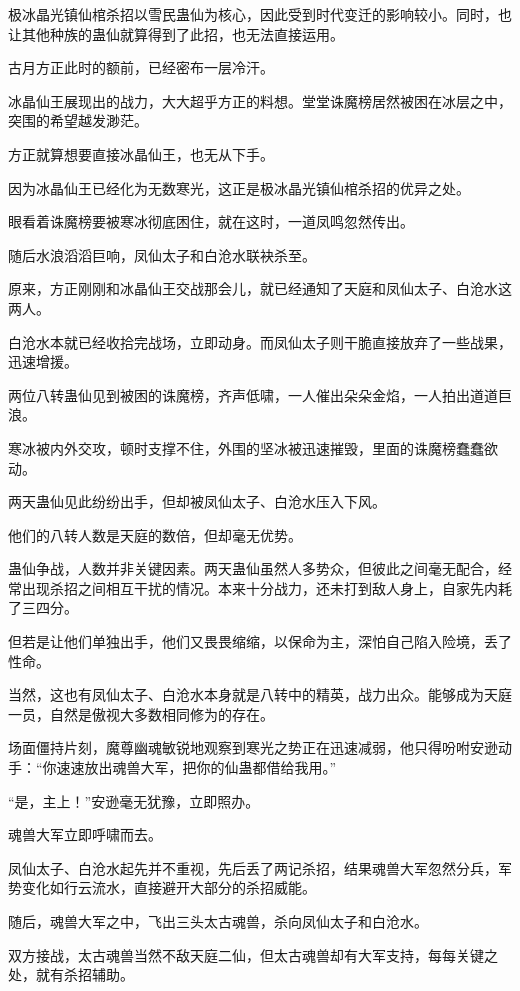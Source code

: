 \begin{this_body}
极冰晶光镇仙棺杀招以雪民蛊仙为核心，因此受到时代变迁的影响较小。同时，也让其他种族的蛊仙就算得到了此招，也无法直接运用。

古月方正此时的额前，已经密布一层冷汗。

冰晶仙王展现出的战力，大大超乎方正的料想。堂堂诛魔榜居然被困在冰层之中，突围的希望越发渺茫。

方正就算想要直接冰晶仙王，也无从下手。

因为冰晶仙王已经化为无数寒光，这正是极冰晶光镇仙棺杀招的优异之处。

眼看着诛魔榜要被寒冰彻底困住，就在这时，一道凤鸣忽然传出。

随后水浪滔滔巨响，凤仙太子和白沧水联袂杀至。

原来，方正刚刚和冰晶仙王交战那会儿，就已经通知了天庭和凤仙太子、白沧水这两人。

白沧水本就已经收拾完战场，立即动身。而凤仙太子则干脆直接放弃了一些战果，迅速增援。

两位八转蛊仙见到被困的诛魔榜，齐声低啸，一人催出朵朵金焰，一人拍出道道巨浪。

寒冰被内外交攻，顿时支撑不住，外围的坚冰被迅速摧毁，里面的诛魔榜蠢蠢欲动。

两天蛊仙见此纷纷出手，但却被凤仙太子、白沧水压入下风。

他们的八转人数是天庭的数倍，但却毫无优势。

蛊仙争战，人数并非关键因素。两天蛊仙虽然人多势众，但彼此之间毫无配合，经常出现杀招之间相互干扰的情况。本来十分战力，还未打到敌人身上，自家先内耗了三四分。

但若是让他们单独出手，他们又畏畏缩缩，以保命为主，深怕自己陷入险境，丢了性命。

当然，这也有凤仙太子、白沧水本身就是八转中的精英，战力出众。能够成为天庭一员，自然是傲视大多数相同修为的存在。

场面僵持片刻，魔尊幽魂敏锐地观察到寒光之势正在迅速减弱，他只得吩咐安逊动手：“你速速放出魂兽大军，把你的仙蛊都借给我用。”

“是，主上！”安逊毫无犹豫，立即照办。

魂兽大军立即呼啸而去。

凤仙太子、白沧水起先并不重视，先后丢了两记杀招，结果魂兽大军忽然分兵，军势变化如行云流水，直接避开大部分的杀招威能。

随后，魂兽大军之中，飞出三头太古魂兽，杀向凤仙太子和白沧水。

双方接战，太古魂兽当然不敌天庭二仙，但太古魂兽却有大军支持，每每关键之处，就有杀招辅助。


\end{this_body}
